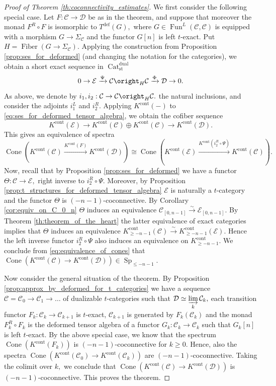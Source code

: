 \documentclass[11pt,leqno]{amsart}
\numberwithin{equation}{section}
\newcommand{\indlim}[1][]{\mathop{\varinjlim}\limits_{#1}}
\newcommand{\xto}{\xrightarrow}
\newcommand{\Cat}{\operatorname{Cat}}
\newcommand{\Cone}{\operatorname{Cone}}
\newcommand{\Fiber}{\operatorname{Fiber}}
\newcommand{\cont}{\operatorname{cont}}
\newcommand{\st}{\operatorname{st}}
\newcommand{\dual}{\operatorname{dual}}
\newcommand{\deff}{\operatorname{def}}
\newcommand{\cD}{{\mathcal D}}
\newcommand{\cC}{{\mathcal C}}
\newcommand{\cE}{{\mathcal E}}
\newcommand{\Fun}{\operatorname{Fun}}
\newcommand{\Sp}{\operatorname{Sp}}
\begin{document}
\begin{proof}[Proof of Theorem \ref{th:coconnectivity_estimates}]
We first consider the following special case. Let $F:\cC\to\cD$ be as in the theorem, and suppose that moreover the monad $F^R\circ F$ is isomorphic to $T^{\deff}(G),$ where $G\in\Fun^L(\cC,\cC)$ is equipped with a morphism $G\to \Sigma_{\cC}$ and the functor $G[n]$ is left $t$-exact. Put $H = \Fiber(G\to\Sigma_{\cC}).$ Applying the construction from Proposition \ref{prop:ses_for_deformed} (and changing the notation for the categories), we obtain a short exact sequence in $\Cat_{\st}^{\dual}$
\begin{equation}\label{eq:ses_for_deformed_tensor_algebra}
0\to \cE\xto{\Psi}\cC\oright_H \cC\xto{\Phi} \cD\to 0. 
\end{equation}
As above, we denote by $i_1,i_2:\cC\to\cC\oright_H \cC.$ the natural inclusions, and consider the adjoints $i_1^L$ and $i_2^R.$ Applying $K^{\cont}(-)$ to \eqref{eq:ses_for_deformed_tensor_algebra}, we obtain the cofiber sequence
\begin{equation*}
K^{\cont}(\cE)\to K^{\cont}(\cC)\oplus K^{\cont}(\cC)\to K^{\cont}(\cD).
\end{equation*}
This gives an equivalence of spectra
\begin{equation}\label{eq:equivalence_of_cones}
\Cone(K^{\cont}(\cC)\xto{K^{\cont}(F)}  K^{\cont}(\cD))\cong \Cone(K^{\cont}(\cE)\xto{K^{\cont}(i_2^R\circ \Psi)} K^{\cont}(\cC)).
\end{equation}
Now, recall that by Proposition \ref{prop:ses_for_deformed} we have a functor $\Theta:\cC\to\cE,$ right inverse to $i_2^R\circ \Psi.$ Moreover, by Proposition \ref{prop:t_structures_for_deformed_tensor_algebra} $\cE$ is naturally a $t$-category and the functor $\Theta$ is $(-n-1)$-coconnective. By Corollary \ref{cor:equiv_on_C_0_n} $\Theta$ induces an equivalence $\cC_{[0,n-1]}\xto{\sim} \cE_{[0,n-1]}.$ By Theorem \ref{th:theorem_of_the_heart} the latter equivalence of exact categories implies that $\Theta$ induces an equivalence $K_{\geq -n-1}^{\cont}(\cC)\xto{\sim} K_{\geq -n-1}^{\cont}(\cE).$ Hence the left inverse functor $i_2^R\circ \Psi$ also induces an equivalence on $K^{\cont}_{\geq -n-1}.$ We conclude from \eqref{eq:equivalence_of_cones} that $\Cone(K^{\cont}(\cC)\to K^{\cont}(\cD))\in \Sp_{\leq -n-1}.$

Now consider the general situation of the theorem. By Proposition \ref{prop:approx_by_deformed_for_t_categories} we have a sequence $\cC=\cC_0\to\cC_1\to\dots$ of dualizable $t$-categories such that $\cD\simeq\indlim[k]\cC_k,$ each transition functor $F_k:\cC_k\to \cC_{k+1}$ is $t$-exact, $\cC_{k+1}$ is generated by $F_k(\cC_k)$ and the monad $F_k^R\circ F_k$ is the deformed tensor algebra of a functor $G_k:\cC_k\to \cC_k$ such that $G_k[n]$ is left $t$-exact. By the above special case, we know that the spectrum $\Cone(K^{\cont}(F_k))$ is $(-n-1)$-coconnective for $k\geq 0.$ Hence, also the spectra $\Cone(K^{\cont}(\cC_0)\to K^{\cont}(\cC_k))$ are $(-n-1)$-coconnective. Taking the colimit over $k,$ we conclude that $\Cone(K^{\cont}(\cC)\to K^{\cont}(\cD))$ is $(-n-1)$-coconnective. This proves the theorem.  
\end{proof}
\end{document}
